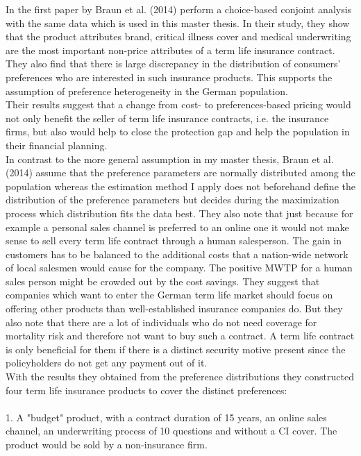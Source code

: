 \documentclass[12pt, abstracton]{article}
\begin{document}
In the first paper by Braun et al. (2014) perform a choice-based conjoint analysis with the same data which is used in this master thesis. In their study, they show that the product attributes brand, critical illness cover and medical underwriting are the most important non-price attributes of a term life insurance contract. They also find that there is large discrepancy in the distribution of consumers' preferences who are interested in such insurance products. This supports the assumption of preference heterogeneity in the German population.\\ Their results suggest that a change from cost- to preferences-based pricing would not only benefit the seller of term life insurance contracts, i.e. the insurance firms, but also would help to close the protection gap and help the population in their financial planning.\\
In contrast to the more general assumption in my master thesis, Braun et al. (2014) assume that the preference parameters are normally distributed among the population whereas the estimation method I apply does not beforehand define the distribution of the preference parameters but decides during the maximization process which distribution fits the data best. They also note that just because for example a personal sales channel is preferred to an online one it would not make sense to sell every term life contract through a human salesperson. The gain in customers has to be balanced to the additional costs that a nation-wide network of local salesmen would cause for the company. The positive MWTP for a human sales person might be crowded out by the cost savings.  They suggest that companies which want to enter the German term life market should focus on offering other products than well-established insurance companies do. But they also note that there are a lot of individuals who do not need coverage for mortality risk and therefore not want to buy such a contract. A term life contract is only beneficial for them if there is a distinct security motive present since the policyholders do not get any payment out of it.\\
With the results they obtained from the preference distributions they constructed four term life insurance products to cover the distinct preferences:\\\\
1. A "budget" product, with a contract duration of 15 years, an online sales channel, an underwriting process of 10 questions and without a CI cover. The product would be sold by a non-insurance firm.\\
\end{document}
